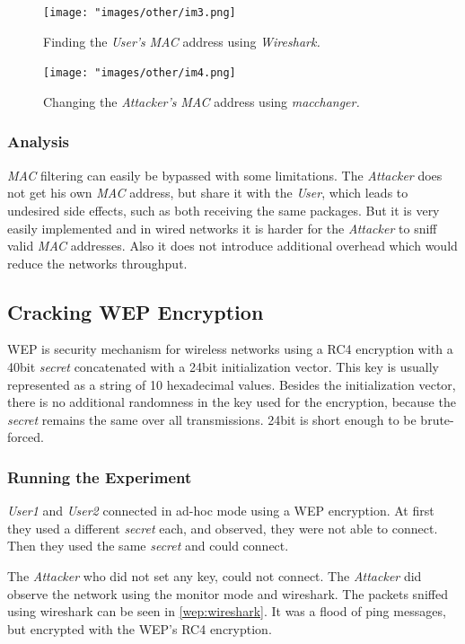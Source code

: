 \documentclass[12pt,a4paper]{article}
\begin{document}
	\begin{figure}
		\texttt{[image: "images/other/im3.png]}
		\caption{Finding the \emph{User's} \emph{MAC} address using \emph{Wireshark.}}
		\label{mac:wireshark}
	\end{figure}
	
	\begin{figure}
		\texttt{[image: "images/other/im4.png]}
		\caption{Changing the \emph{Attacker's} \emph{MAC} address using \emph{macchanger.}}
		\label{mac:changer}
	\end{figure}
	\subsubsection{Analysis}
		\emph{MAC} filtering can easily be bypassed with some limitations. The \emph{Attacker} does not get his own \emph{MAC} address, but share it with the \emph{User}, which leads to undesired side effects, such as both receiving the same packages. But it is very easily implemented and in wired networks it is harder for the \emph{Attacker} to sniff valid \emph{MAC} addresses. Also it does not introduce additional overhead which would reduce the networks throughput.
		
  \subsection{Cracking WEP Encryption}
	WEP is security mechanism for wireless networks using a RC4 encryption with a 40bit \emph{secret} concatenated with a 24bit initialization vector. This key is usually represented as a string of 10 hexadecimal values. Besides the initialization vector, there is no additional randomness in the key used for the encryption, because the \emph{secret} remains the same over all transmissions. 24bit is short enough to be brute-forced.
	
	\subsubsection{Running the Experiment}
		\emph{User1} and \emph{User2} connected in ad-hoc mode using a WEP encryption.
		At first they used a different \emph{secret} each, and observed, they were not able to connect. Then they used the same \emph{secret} and could connect.
		
		The \emph{Attacker} who did not set any key, could not connect.
		The \emph{Attacker} did observe the network using the monitor mode and wireshark.
		The packets sniffed using wireshark can be seen in \autoref{wep:wireshark}. It was a flood of ping messages, but encrypted with the WEP's RC4 encryption.
		
\end{document}
